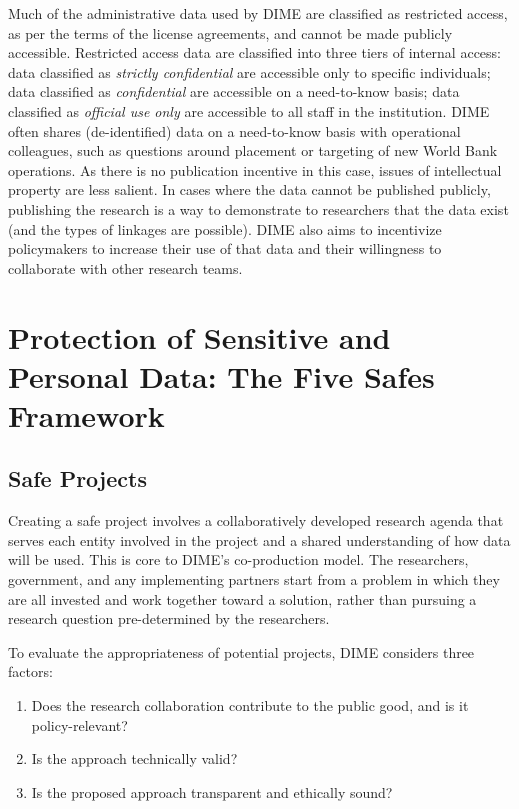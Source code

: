 Much of the administrative data used by DIME are classified as restricted access, as per the terms of the license agreements, and cannot be made publicly accessible. Restricted access data are classified into three tiers of internal access: data classified as \emph{strictly confidential} are accessible only to specific individuals; data classified as \emph{confidential} are accessible on a need-to-know basis; data classified as \emph{official use only} are accessible to all staff in the institution. DIME often shares (de-identified) data on a need-to-know basis with operational colleagues, such as questions around placement or targeting of new World Bank operations. As there is no publication incentive in this case, issues of intellectual property are less salient. In cases where the data cannot be published publicly, publishing the research is a way to demonstrate to researchers that the data exist (and the types of linkages are possible). DIME also aims to incentivize policymakers to increase their use of that data and their willingness to collaborate with other research teams.

\hypertarget{protection-of-sensitive-and-personal-data-the-five-safes-framework-6}{%
\section{Protection of Sensitive and Personal Data: The Five Safes Framework}\label{protection-of-sensitive-and-personal-data-the-five-safes-framework-6}}

\hypertarget{safe-projects-6}{%
\subsection{Safe Projects}\label{safe-projects-6}}

Creating a safe project involves a collaboratively developed research agenda that serves each entity involved in the project and a shared understanding of how data will be used. This is core to DIME's co-production model. The researchers, government, and any implementing partners start from a problem in which they are all invested and work together toward a solution, rather than pursuing a research question pre-determined by the researchers.

To evaluate the appropriateness of potential projects, DIME considers three factors:

\begin{enumerate}
\def\labelenumi{(\arabic{enumi})}
\tightlist
\item
  Does the research collaboration contribute to the public good, and is it policy-relevant?
\item
  Is the approach technically valid?
\item
  Is the proposed approach transparent and ethically sound?
\end{enumerate}

